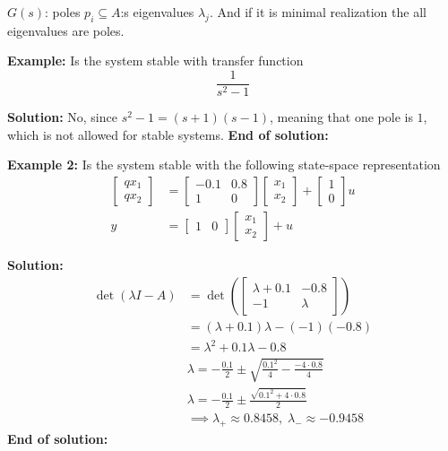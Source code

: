 \begin{multicols}{2}
$G(s)$: poles $p_i \subseteq A$:s eigenvalues $\lambda_j$. 
And if it is minimal realization the all eigenvalues are poles.

\textbf{Example:}\newline
Is the system stable with transfer function 
\begin{equation*}
    \frac{1}{s^2-1}
\end{equation*}

\textbf{Solution:}\newline
No, since $s^2-1=(s+1)(s-1)$, meaning that one pole is $1$,
which is not allowed for stable systems.\newline
\textbf{End of solution:}

\textbf{Example 2:}\newline
Is the system stable with the following state-space representation
\begin{align*}
    \begin{bmatrix} qx_1 \\ qx_2 \end{bmatrix} &= 
    \begin{bmatrix} -0.1 & 0.8 \\ 1 & 0 \end{bmatrix}
    \begin{bmatrix} x_1 \\ x_2 \end{bmatrix}
    + \begin{bmatrix} 1 \\ 0 \end{bmatrix}u \\
    y &= \begin{bmatrix} 1 & 0 \end{bmatrix}
    \begin{bmatrix} x_1 \\ x_2 \end{bmatrix}
    +u
\end{align*}

\textbf{Solution:}
\begin{align*}
    \det{(\lambda I - A)} &= \det{\left(\begin{bmatrix} \lambda + 0.1 & -0.8 \\ -1 & \lambda \end{bmatrix}\right)} \\
    &=(\lambda + 0.1)\lambda - (-1)(-0.8) \\
    &=\lambda^2 + 0.1\lambda - 0.8 \\
    &\lambda = -\frac{0.1}{2} \pm \sqrt{\frac{0.1^2}{4} - \frac{-4\cdot0.8}{4}} \\
    &\lambda = -\frac{0.1}{2} \pm \frac{\sqrt{0.1^2 +4\cdot0.8}}{2} \\
    &\implies\lambda_+ \approx 0.8458,\;  \lambda_- \approx -0.9458
\end{align*}
\textbf{End of solution:}



\end{multicols}
